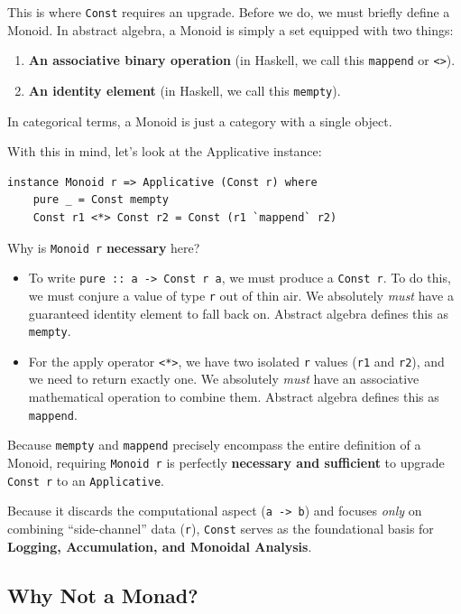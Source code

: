 \documentclass[12pt,a4paper]{article}
\begin{document}
This is where \texttt{Const} requires an upgrade. Before we do, we must briefly define a Monoid. In abstract algebra, a Monoid is simply a set equipped with two things:
\begin{enumerate}
    \item \textbf{An associative binary operation} (in Haskell, we call this \texttt{mappend} or \texttt{<>}).
    \item \textbf{An identity element} (in Haskell, we call this \texttt{mempty}).
\end{enumerate}

In categorical terms, a Monoid is just a category with a single object. 

With this in mind, let's look at the Applicative instance:
\begin{lstlisting}
instance Monoid r => Applicative (Const r) where
    pure _ = Const mempty
    Const r1 <*> Const r2 = Const (r1 `mappend` r2)
\end{lstlisting}

Why is \texttt{Monoid r} \textbf{necessary} here? 
\begin{itemize}
    \item To write \texttt{pure :: a -> Const r a}, we must produce a \texttt{Const r}. To do this, we must conjure a value of type \texttt{r} out of thin air. We absolutely \textit{must} have a guaranteed identity element to fall back on. Abstract algebra defines this as \texttt{mempty}.
    \item For the apply operator \texttt{<*>}, we have two isolated \texttt{r} values (\texttt{r1} and \texttt{r2}), and we need to return exactly one. We absolutely \textit{must} have an associative mathematical operation to combine them. Abstract algebra defines this as \texttt{mappend}.
\end{itemize}

Because \texttt{mempty} and \texttt{mappend} precisely encompass the entire definition of a Monoid, requiring \texttt{Monoid r} is perfectly \textbf{necessary and sufficient} to upgrade \texttt{Const r} to an \texttt{Applicative}. 

Because it discards the computational aspect (\texttt{a -> b}) and focuses \textit{only} on combining ``side-channel'' data (\texttt{r}), \texttt{Const} serves as the foundational basis for \textbf{Logging, Accumulation, and Monoidal Analysis}.

\subsection{Why Not a Monad?}
\end{document}
